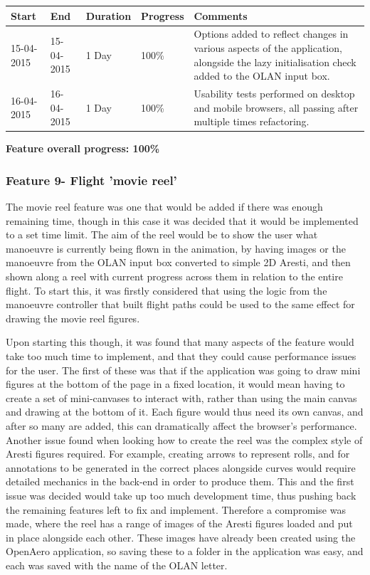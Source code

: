 \begin{table}[h]
\begin{tabular}{|l|l|l|l|p{7cm}|}
\hline
\textbf{Start} & \textbf{End} & \textbf{Duration} & \textbf{Progress} & \textbf{Comments}                                                                                                     \\ \hline
15-04-2015     & 15-04-2015   & 1 Day            & 100\%             &  Options added to reflect changes in various aspects of the application, alongside the lazy initialisation check added to the OLAN input box.\\ \hline
16-04-2015     & 16-04-2015   & 1 Day            & 100\%             &  Usability tests performed on desktop and mobile browsers, all passing after multiple times refactoring. \\ \hline
\end{tabular}
\end{table}

\textbf{Feature overall progress: 100\%}

\subsubsection{Feature 9- Flight 'movie reel'}
The movie reel feature was one that would be added if there was enough remaining time, though in this case it was decided that it would be implemented to a set time limit. The aim of the reel would be to show the user what manoeuvre is currently being flown in the animation, by having images or the manoeuvre from the OLAN input box converted to simple 2D Aresti, and then shown along a reel with current progress across them in relation to the entire flight. To start this, it was firstly considered that using the logic from the manoeuvre controller that built flight paths could be used to the same effect for drawing the movie reel figures. 

Upon starting this though, it was found that many aspects of the feature would take too much time to implement, and that they could cause performance issues for the user. The first of these was that if the application was going to draw mini figures at the bottom of the page in a fixed location, it would mean having to create a set of mini-canvases to interact with, rather than using the main canvas and drawing at the bottom of it. Each figure would thus need its own canvas, and after so many are added, this can dramatically affect the browser's performance. Another issue found when looking how to create the reel was the complex style of Aresti figures required. For example, creating arrows to represent rolls, and for annotations to be generated in the correct places alongside curves would require detailed mechanics in the back-end in order to produce them. This and the first issue was decided would take up too much development time, thus pushing back the remaining features left to fix and implement. Therefore a compromise was made, where the reel has a range of images of the Aresti figures loaded and put in place alongside each other. These images have already been created using the OpenAero application, so saving these to a folder in the application was easy, and each was saved with the name of the OLAN letter. 

